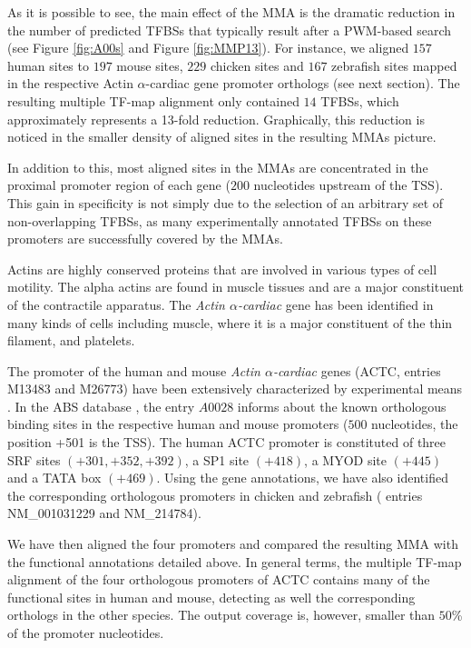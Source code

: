 As it is possible to see, the main effect of the MMA is the
dramatic reduction in the number of predicted TFBSs that typically
result after a PWM-based search (see Figure \ref{fig:A00s} and Figure \ref{fig:MMP13}). 
For instance, we aligned $157$ human sites to $197$ mouse sites, $229$ chicken sites
and $167$ zebrafish sites mapped in the respective Actin $\alpha$-cardiac 
gene promoter orthologs (see next section). The resulting multiple TF-map alignment 
only contained $14$ TFBSs, which approximately represents a 13-fold reduction.
Graphically, this reduction is noticed in the smaller density of aligned sites in 
the resulting MMAs picture.

In addition to this, most aligned sites in the MMAs are concentrated in the 
proximal promoter region of each gene ($200$ nucleotides upstream of the TSS). This gain 
in specificity is not simply due to the selection of an arbitrary set of non-overlapping 
TFBSs, as many experimentally annotated TFBSs on these promoters are successfully covered 
by the MMAs.



Actins are highly conserved proteins that are involved in various types of cell motility.
The alpha actins are found in muscle tissues and are a major constituent of the contractile 
apparatus. The \emph{Actin $\alpha$-cardiac} gene has been identified in many kinds of cells 
including muscle, where it is a major constituent of the thin filament, and platelets.

The promoter of the human and mouse \emph{Actin $\alpha$-cardiac} genes
(ACTC, \genbank{} entries M13483 and M26773) have been extensively characterized by 
experimental means \citep{wasserman:1998a}. In the ABS database \citep{blanco:2006a}, the 
entry $A0028$ informs about the known orthologous binding sites in the respective human 
and mouse promoters ($500$ nucleotides, the position +501 is the TSS).
The human ACTC promoter is constituted of three SRF sites $(+301, +352, +392)$, 
a SP1 site $(+418)$, a MYOD site $(+445)$ and a TATA box $(+469)$.
Using the  gene annotations, we have also identified the 
corresponding orthologous promoters in chicken and zebrafish ( entries 
NM\_001031229 and NM\_214784).

We have then aligned the four promoters and compared the resulting MMA with the
functional annotations detailed above. In general terms, the multiple TF-map
alignment of the four orthologous promoters of ACTC contains many of the
functional sites in human and mouse, detecting as well the corresponding
orthologs in the other species. The output coverage is, however, smaller 
than $50$\% of the promoter nucleotides.

